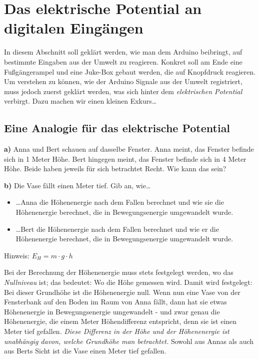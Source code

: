 \vfill
\newpage
\section{Das elektrische Potential an digitalen Eingängen}

In diesem Abschnitt soll geklärt werden, wie man dem Arduino beibringt, auf bestimmte Eingaben aus der Umwelt zu reagieren. Konkret soll am Ende eine Fußgängerampel und eine Juke-Box gebaut werden, die auf Knopfdruck reagieren. Um verstehen zu können, wie der Arduino Signale aus der Umwelt registriert, muss jedoch zuerst geklärt werden, was sich hinter dem \emph{elektrischen Potential} verbirgt. Dazu machen wir einen kleinen Exkurs\dots

\subsection{Eine Analogie für das elektrische Potential}

\begin{ziel}
	\textbf{a)} Anna und Bert schauen auf dasselbe Fenster. %
	Anna meint, das Fenster befinde sich in 1 Meter Höhe. Bert hingegen meint, das Fenster befinde sich in 4 Meter Höhe. Beide haben jeweils für sich betrachtet Recht. Wie kann das sein?
	
	\textbf{b)} Die Vase fällt einen Meter tief. Gib an, wie\dots
	\begin{itemize}[itemsep=0ex]
		\item \dots Anna die Höhenenergie nach dem Fallen berechnet und wie sie die Höhenenergie berechnet, die in Bewegungsenergie umgewandelt wurde.
		\item \dots Bert die Höhenenergie nach dem Fallen berechnet und wie er die Höhenenergie berechnet, die in Bewegungsenergie umgewandelt wurde.
	\end{itemize}

	Hinweis: $E_H=m\cdot g\cdot h$
\end{ziel}

Bei der Berechnung der Höhenenergie muss stets festgelegt werden, wo das \emph{Nullniveau} ist; das bedeutet: Wo die Höhe gemessen wird. Damit wird festgelegt: Bei dieser Grundhöhe ist die Höhenenergie null. Wenn nun eine Vase von der Fensterbank auf den Boden im Raum von Anna fällt, dann hat sie etwas Höhenenergie in Bewegungsenergie umgewandelt - und zwar genau die Höhenenergie, die einem Meter Höhendifferenz entspricht, denn sie ist einen Meter tief gefallen. \emph{Diese Differenz in der Höhe und der Höhenenergie ist unabhängig davon, welche Grundhöhe man betrachtet.} Sowohl aus Annas als auch aus Berts Sicht ist die Vase einen Meter tief gefallen.

